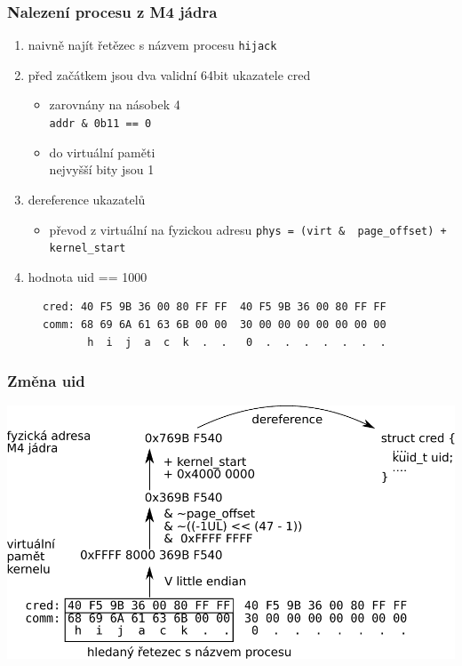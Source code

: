 \documentclass{beamer}
\begin{document}
\begin{frame}[fragile]
\frametitle{Nalezení procesu z M4 jádra}
\begin{enumerate}
	\item naivně najít řetězec s názvem procesu \texttt{hijack}
	\item před začátkem jsou dva validní 64bit ukazatele cred
	\begin{itemize}
		\item zarovnány na násobek 4 \\ \texttt{addr & 0b11 == 0}
		\item do virtuální paměti \\ 
		nejvyšší bity jsou 1
	\end{itemize}
	\item dereference ukazatelů
		\begin{itemize}
		\item převod z virtuální na fyzickou adresu
		 \texttt{phys = (virt & ~page_offset) + kernel_start}
	\end{itemize}
	\item hodnota uid == 1000
\end{enumerate}
\begin{figure}
	\begin{verbatim}
cred: 40 F5 9B 36 00 80 FF FF  40 F5 9B 36 00 80 FF FF
comm: 68 69 6A 61 63 6B 00 00  30 00 00 00 00 00 00 00
       h  i  j  a  c  k  .  .   0  .  .  .  .  .  .  .
	\end{verbatim}
\end{figure}
\end{frame}

\begin{frame}
\frametitle{Změna uid}
\includegraphics[width=\linewidth]{figures/hexdump.pdf}
\end{frame}
\end{document}
